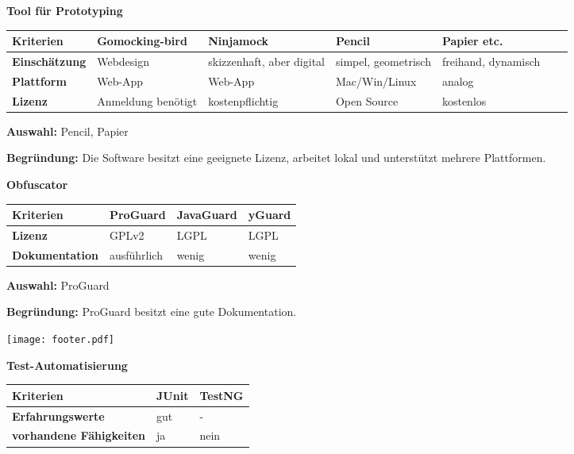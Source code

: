 \documentclass[12pt]{article}
\begin{document}
\textbf{Tool für Prototyping}

\begin{tabularx}{\textwidth}{|X|X|X|X|X|X|X|}\hline
 \textbf{Kriterien}&\textbf{Gomocking-bird}&\textbf{Ninjamock}&\textbf{Pencil}&\textbf{Papier etc.}\\ \hline
 \textbf{Einschätzung}&Webdesign&skizzenhaft, aber digital&simpel, geometrisch&freihand, dynamisch\\ \hline
 \textbf{Plattform}&Web-App&Web-App&Mac/Win/Linux&analog\\ \hline
 \textbf{Lizenz}&Anmeldung benötigt&kostenpflichtig&Open Source&kostenlos\\ \hline
\end{tabularx}

\vspace*{3mm}

\textbf{Auswahl:} Pencil, Papier

\textbf{Begründung:} Die Software besitzt eine geeignete Lizenz, arbeitet lokal und unterstützt mehrere Plattformen.

\vspace*{10mm}

\textbf{Obfuscator}

\begin{tabularx}{\textwidth}{|X|X|X|X|}\hline
 \textbf{Kriterien}&\textbf{ProGuard}&\textbf{JavaGuard}&\textbf{yGuard}\\ \hline
 \textbf{Lizenz}&GPLv2&LGPL&LGPL\\ \hline
 \textbf{Dokumentation}&ausführlich&wenig&wenig\\ \hline
\end{tabularx}

\vspace*{3mm}

\textbf{Auswahl:} ProGuard

\textbf{Begründung:} ProGuard besitzt eine gute Dokumentation.

\vspace*{3mm}
\vspace*{\fill}
\texttt{[image: footer.pdf]}
\thispagestyle{empty}

\newpage


\textbf{Test-Automatisierung}

\begin{tabularx}{\textwidth}{|X|X|X|}\hline
 \textbf{Kriterien}&\textbf{JUnit}&\textbf{TestNG}\\ \hline
 \textbf{Erfahrungswerte}&gut&-\\ \hline
 \textbf{vorhandene Fähigkeiten}&ja&nein\\ \hline
\end{tabularx}
\end{document}
